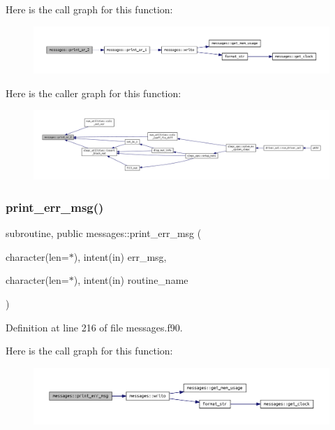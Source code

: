 Here is the call graph for this function\+:
\nopagebreak
\begin{figure}[H]
\begin{center}
\leavevmode
\includegraphics[width=350pt]{namespacemessages_a80797cedef6112b8dccaeda431f0c610_cgraph}
\end{center}
\end{figure}
Here is the caller graph for this function\+:
\nopagebreak
\begin{figure}[H]
\begin{center}
\leavevmode
\includegraphics[width=350pt]{namespacemessages_a80797cedef6112b8dccaeda431f0c610_icgraph}
\end{center}
\end{figure}
\mbox{\label{namespacemessages_a0da9248828de8b7480b99b47618e8310}} 
\subsubsection{\texorpdfstring{print\+\_\+err\+\_\+msg()}{print\_err\_msg()}}
{\footnotesize\ttfamily subroutine, public messages\+::print\+\_\+err\+\_\+msg (\begin{DoxyParamCaption}\item[{character(len=$\ast$), intent(in)}]{err\+\_\+msg,  }\item[{character(len=$\ast$), intent(in)}]{routine\+\_\+name }\end{DoxyParamCaption})}



Definition at line 216 of file messages.\+f90.

Here is the call graph for this function\+:
\nopagebreak
\begin{figure}[H]
\begin{center}
\leavevmode
\includegraphics[width=350pt]{namespacemessages_a0da9248828de8b7480b99b47618e8310_cgraph}
\end{center}
\end{figure}
\mbox{\label{namespacemessages_a0b3d8398d726bbf90e0c6df9f2df2c88}} 
